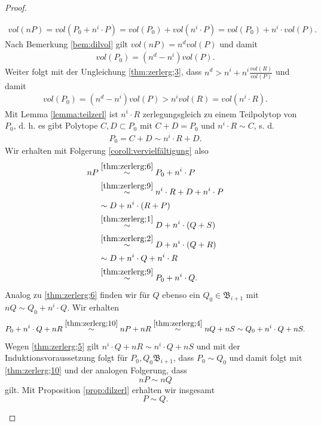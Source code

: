 \documentclass[11pt,titlepage]{article}
\theoremstyle{definition}
\theoremstyle{remark}
\begin{document}
\begin{proof}
\begin{itemize}
\begin{align*}
			vol(nP)=vol(P_0+n^i\cdot P)=vol(P_0)+vol(n^i\cdot P)=vol(P_0)+
			n^i\cdot vol(P).
			\end{align*}
			Nach Bemerkung \ref{bem:dilvol} gilt $vol(nP)=n^d vol(P)$ und damit 
			\begin{align}
			vol(P_0)=(n^d -n^i)vol(P). \label{thm:zerlerg;7}
			\end{align}
			Weiter folgt mit der Ungleichung \ref{thm:zerlerg;3}, dass 
			$n^d > n^i+n^i\frac{vol(R)}{vol(P)}$ und damit
			\begin{align}
				vol(P_0)=(n^d -n^i)vol(P)>n^i vol(R)=vol(n^i\cdot R)\label{thm:zerlerg;8}.
			\end{align}
			Mit Lemma \ref{lemma:teilzerl} 
			ist $n^i\cdot R$ zerlegungsgleich zu einem Teilpolytop von $P_0$, d. h. es gibt Polytope $C,D\subset P_0$ mit $C+D=P_0$ und $n^i\cdot R\sim C$, s. d. 
			\begin{align}
			P_0=C+D\sim n^i\cdot R+D. \label{thm:zerlerg;9}
			\end{align}
			Wir erhalten mit Folgerung \ref{coroll:vervielfältigung} also
			\begin{align}
			nP &\overset{\ref{thm:zerlerg;6}}{\sim} P_0+n^i \cdot P \notag\\
			&\overset{\ref{thm:zerlerg;9}}{\sim} n^i\cdot R +D+n^i \cdot P \notag\\
			&\sim D+n^i\cdot(R+P) \notag\\ 
			&\overset{\ref{thm:zerlerg;1}}{\sim} D+n^i\cdot(Q+S) \notag\\
			&\overset{\ref{thm:zerlerg;2}}{\sim} D+n^i\cdot(Q+R) \notag\\
			&\sim D+n^i\cdot Q +n^i\cdot R \notag\\
			&\overset{\ref{thm:zerlerg;9}}{\sim} P_0+n^i \cdot Q. \label{thm:zerlerg;10}
			\end{align}
			Analog zu \ref{thm:zerlerg;6} finden wir für $Q$ ebenso ein 
			$Q_0\in\mathfrak{B}_{i+1}$ mit $nQ\sim Q_0+n^i\cdot Q$. Wir erhalten 
			\[P_0+n^i\cdot Q+nR\overset{\ref{thm:zerlerg;10}}{\sim}
			nP+nR\overset{\ref{thm:zerlerg;4}}{\sim}nQ+nS\sim Q_0+n^i\cdot Q+nS.\]
			Wegen \ref{thm:zerlerg;5} gilt $n^i\cdot Q+nR\sim n^i\cdot Q +nS$ und 
			mit der Induktionsvoraussetzung folgt für $P_0,Q_0\mathfrak{B}_{i+1}
			$, dass 
			$P_0\sim Q_0$ und damit folgt mit \ref{thm:zerlerg;10} und der 
			analogen Folgerung, dass 
			\[nP\sim nQ\]
			gilt. Mit Proposition \ref{prop:dilzerl} erhalten wir insgesamt 
			\[P\sim Q.\]
		\end{itemize}
	\end{proof}
	
\end{document}
